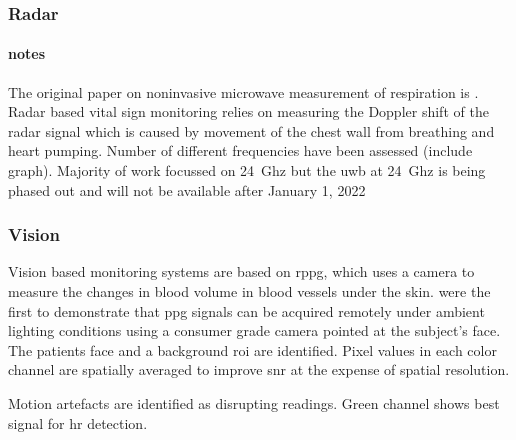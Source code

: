 \documentclass[11pt, parskip=half*,twoside=false]{scrbook}
\begin{document}

\subsubsection{Radar}
\paragraph{notes}
The original paper on noninvasive microwave measurement of respiration is  \citep{linNoninvasiveMicrowaveMeasurement1975}.  Radar based vital sign monitoring relies on measuring the Doppler shift of the radar signal which is caused by movement of the chest wall from breathing and heart pumping. Number of different frequencies have been assessed \citep{singhMultiResidentNonContactVital2021}(include graph). Majority of work focussed on 24~Ghz but the \gls{uwb} at 24~Ghz is being phased out and will not be available after January 1, 2022 \citep{ramasubramanianMovingLegacy242018}

\subsubsection{Vision}
Vision based monitoring systems are based on \gls{rppg}, which uses a camera to measure the changes in blood volume in blood vessels under the skin. \citet{verkruysseRemotePlethysmographicImaging2008} were the first to demonstrate that \gls{ppg} signals can be acquired remotely under ambient lighting conditions using a consumer grade camera pointed at the subject's face. The patients face and a background \gls{roi} are identified. Pixel values in each color channel are spatially averaged to improve \gls{snr} at the expense of spatial resolution. 

Motion artefacts are identified as disrupting readings. Green channel shows best signal for \gls{hr} detection.
\end{document}
